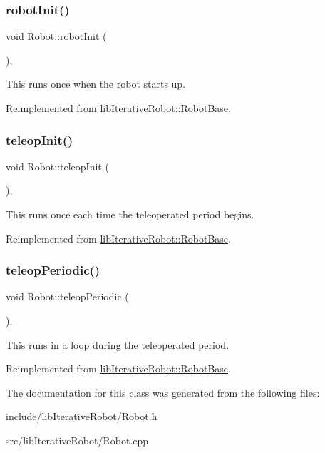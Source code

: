\subsubsection{\texorpdfstring{robotInit()}{robotInit()}}
{\footnotesize\ttfamily void Robot\+::robot\+Init (\begin{DoxyParamCaption}{ }\end{DoxyParamCaption})\hspace{0.3cm}{\ttfamily [protected]}, {\ttfamily [virtual]}}

This runs once when the robot starts up. 

Reimplemented from \mbox{\hyperlink{classlib_iterative_robot_1_1_robot_base_a1e690e472e901ac99bb7ce6f3b6a33ea}{lib\+Iterative\+Robot\+::\+Robot\+Base}}.

\mbox{\label{class_robot_a8fc4fbb8f758d7223d062e1b4a915232}} 
\subsubsection{\texorpdfstring{teleopInit()}{teleopInit()}}
{\footnotesize\ttfamily void Robot\+::teleop\+Init (\begin{DoxyParamCaption}{ }\end{DoxyParamCaption})\hspace{0.3cm}{\ttfamily [protected]}, {\ttfamily [virtual]}}

This runs once each time the teleoperated period begins. 

Reimplemented from \mbox{\hyperlink{classlib_iterative_robot_1_1_robot_base_a290bea17acf9bc884a490472e9d2e039}{lib\+Iterative\+Robot\+::\+Robot\+Base}}.

\mbox{\label{class_robot_a78f62f5d6eb05e27bfa1998fc35a519c}} 
\subsubsection{\texorpdfstring{teleopPeriodic()}{teleopPeriodic()}}
{\footnotesize\ttfamily void Robot\+::teleop\+Periodic (\begin{DoxyParamCaption}{ }\end{DoxyParamCaption})\hspace{0.3cm}{\ttfamily [protected]}, {\ttfamily [virtual]}}

This runs in a loop during the teleoperated period. 

Reimplemented from \mbox{\hyperlink{classlib_iterative_robot_1_1_robot_base_a564ee86d582b598dd0713c067b352aef}{lib\+Iterative\+Robot\+::\+Robot\+Base}}.



The documentation for this class was generated from the following files\+:\begin{DoxyCompactItemize}
\item 
include/lib\+Iterative\+Robot/Robot.\+h\item 
src/lib\+Iterative\+Robot/Robot.\+cpp\end{DoxyCompactItemize}
